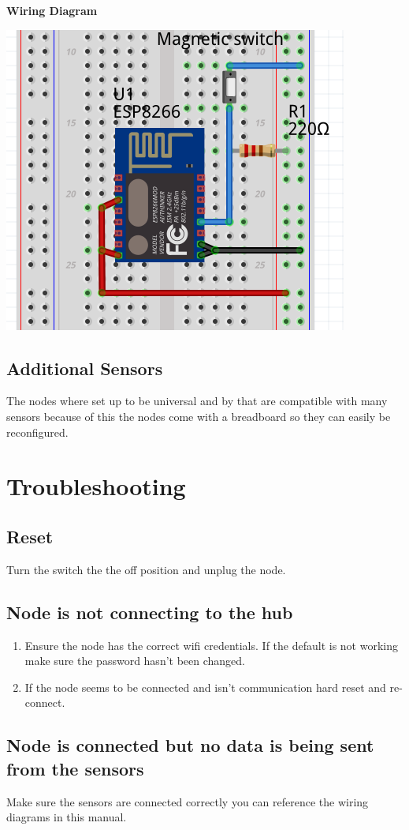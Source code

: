       \textbf{Wiring Diagram}\\
      \begin{center}
        \includegraphics[scale=0.25]{images/door-cir.png}
        \end{center}
    \subsection{Additional Sensors}
      The nodes where set up to be universal and by that are compatible with
      many sensors because of this the nodes come with a breadboard so they can
      easily be reconfigured.\\
\newpage
  \section{Troubleshooting}
  \subsection{Reset}
  Turn the switch the the off position and unplug the node.
  \subsection{Node is not connecting to the hub}
  \begin{enumerate}
    \item Ensure the node has the correct wifi credentials. If the default is not
    working make sure the password hasn't been changed.
    \item If the node seems to be connected and isn't communication hard reset and re-connect.
  \end{enumerate}
  \subsection{Node is connected but no data is being sent from the sensors}
  Make sure the sensors are connected correctly you can reference the wiring diagrams
  in this manual.



